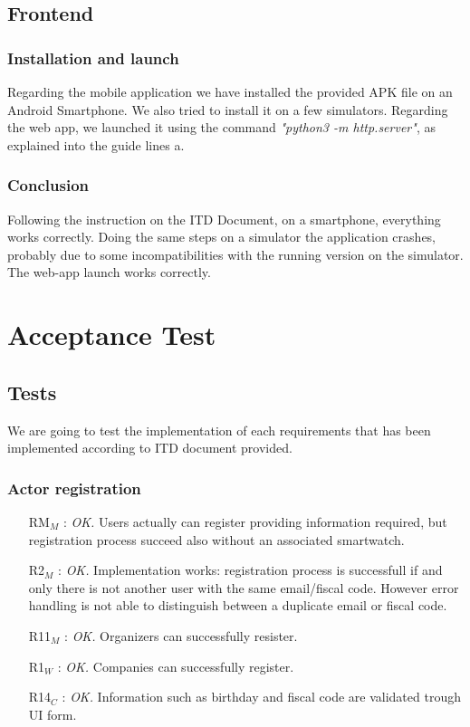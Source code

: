 \documentclass{article}
\begin{document}
\newpage	
\subsection{Frontend}
\subsubsection{Installation and launch}
Regarding the mobile application we have installed the provided APK file on an Android Smartphone. We also tried to install it on a few simulators.\newline
Regarding the web app, we launched it using the command \textit{"python3 -m http.server"}, as explained into the guide lines a.
\subsubsection{Conclusion}
Following the instruction on the ITD Document, on a smartphone, everything works correctly.
Doing the same steps on a simulator the application crashes, probably due to some incompatibilities with the running version on the simulator.	\newline
The web-app launch works correctly.
\newpage



\section{Acceptance Test}
\subsection{Tests}
We are going to test the implementation of each requirements that has been implemented according to ITD document provided.

\subsubsection{Actor registration}
\begin{itemize}
	\item [RM$_M$]: \textit{OK.} Users actually can register providing information required, but registration process succeed also without an associated smartwatch.
	\item [R2$_M$]: \textit{OK.} Implementation works: registration process is successfull if and only there is not another user with the same email/fiscal code. However error handling is not able to distinguish between a duplicate email or fiscal code.
	\item [R11$_M$]: \textit{OK.} Organizers can successfully resister.
	\item [R1$_W$]: \textit{OK.} Companies can successfully register.
	\item [R14$_C$]: \textit{OK.} Information such as birthday and fiscal code are validated trough UI form.
\end{itemize}
\end{document}

